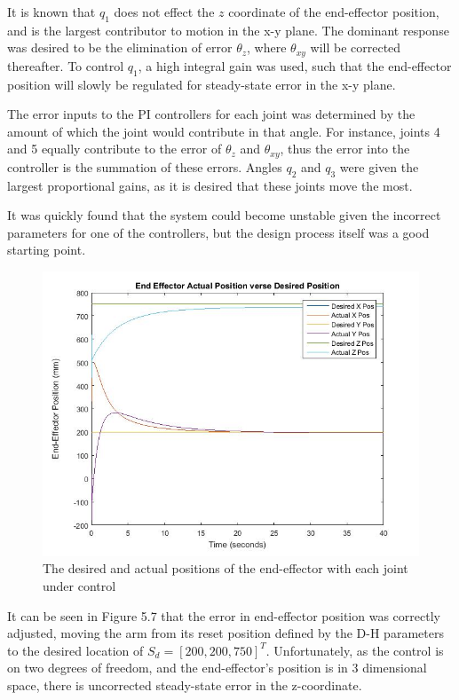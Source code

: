 \documentclass[12pt,openany,a4paper]{book}
\begin{document}
It is known that $q_1$ does not effect the $z$ coordinate of the end-effector position, and is the largest contributor to motion in the x-y plane. The dominant response was desired to be the elimination of error $\theta_z$, where $\theta_{xy}$ will be corrected thereafter. To control $q_1$, a high integral gain was used, such that the end-effector position will slowly be regulated for steady-state error in the x-y plane. 

The error inputs to the PI controllers for each joint was determined by the amount of which the joint would contribute in that angle. For instance, joints 4 and 5 equally contribute to the error of $\theta_z$ and $\theta_{xy}$, thus the error into the controller is the summation of these errors. Angles $q_2$ and $q_3$ were given the largest proportional gains, as it is desired that these joints move the most.

It was quickly found that the system could become unstable given the incorrect parameters for one of the controllers, but the design process itself was a good starting point.
\clearpage
\begin{center}
\begin{figure}[htb]
  \includegraphics[width=1\linewidth]{matlab_inv_des_act.jpg}
\caption{The desired and actual positions of the end-effector with each joint under control}
\end{figure}
\end{center}

It can be seen in Figure 5.7 that the error in end-effector position was correctly adjusted, moving the arm from its reset position defined by the D-H parameters to the desired location of $S_d = [200, 200, 750]^T$. Unfortunately, as the control is on two degrees of freedom, and the end-effector's position is in 3 dimensional space, there is uncorrected steady-state error in the z-coordinate.
\end{document}
